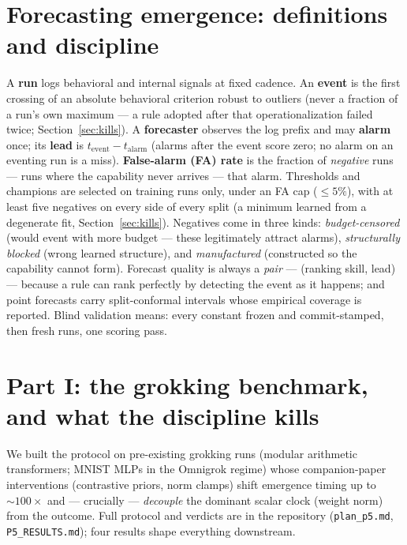 \documentclass[11pt]{article}
\newcommand{\tev}{t_{\mathrm{event}}}
\begin{document}
\section{Forecasting emergence: definitions and discipline}
\label{sec:defs}

A \textbf{run} logs behavioral and internal signals at fixed cadence. An \textbf{event}
is the first crossing of an absolute behavioral criterion robust to outliers (never a
fraction of a run's own maximum --- a rule adopted after that operationalization failed
twice; Section~\ref{sec:kills}). A \textbf{forecaster} observes the log prefix and may
\textbf{alarm} once; its \textbf{lead} is $\tev - t_{\mathrm{alarm}}$ (alarms after the
event score zero; no alarm on an eventing run is a miss). \textbf{False-alarm (FA)
rate} is the fraction of \emph{negative} runs --- runs where the capability never
arrives --- that alarm. Thresholds and champions are selected on training runs only,
under an FA cap ($\leq 5\%$), with at least five negatives on every side of every
split (a minimum learned from a degenerate fit, Section~\ref{sec:kills}). Negatives
come in three kinds: \emph{budget-censored} (would event with more budget --- these
legitimately attract alarms), \emph{structurally blocked} (wrong learned structure),
and \emph{manufactured} (constructed so the capability cannot form). Forecast quality
is always a \emph{pair} --- (ranking skill, lead) --- because a rule can rank
perfectly by detecting the event as it happens; and point forecasts carry
split-conformal intervals whose empirical coverage is reported. Blind validation means:
every constant frozen and commit-stamped, then fresh runs, one scoring pass.

\section{Part I: the grokking benchmark, and what the discipline kills}
\label{sec:grok}

We built the protocol on \vCorpus{} pre-existing grokking runs (modular arithmetic
transformers; MNIST MLPs in the Omnigrok regime) whose companion-paper interventions
(contrastive priors, norm clamps) shift emergence timing up to ${\sim}100\times$ and
--- crucially --- \emph{decouple} the dominant scalar clock (weight norm) from the
outcome. Full protocol and verdicts are in the repository
(\texttt{plan\_p5.md}, \texttt{P5\_RESULTS.md}); four results shape everything
downstream.
\end{document}
